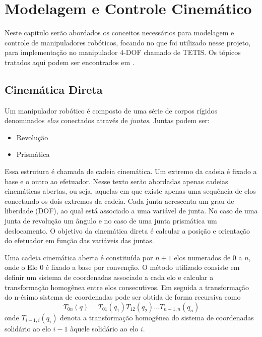 \chapter{Modelagem e Controle Cinemático}
Neste capitulo serão abordados os conceitos necessários para modelagem e controle de manipuladores robóticos, focando no que foi utilizado nesse projeto, para implementação no manipulador 4-DOF chamado de TETIS. Os tópicos tratados aqui podem ser encontrados em \citep{siciliano, petercorke}.

\section{Cinemática Direta}
Um manipulador robótico é composto de uma série de corpos rígidos denominados \textit{elos} conectados através de \textit{juntas}. 
Juntas podem ser:
\begin{itemize} 
\item Revolução
\item Prismática
\end{itemize}

Essa estrutura é chamada de cadeia cinemática.
Um extremo da cadeia é fixado a base e o outro ao efetuador.
Nesse texto serão abordadas apenas cadeias cinemáticas abertas, ou seja, aquelas em que existe apenas uma sequência de elos conectando os dois extremos da cadeia.
Cada junta acrescenta um grau de liberdade (DOF), ao qual está associado a uma variável de junta. No caso de uma junta de revolução um ângulo e no caso de uma junta prismática um deslocamento.
O objetivo da cinemática direta é calcular a posição e orientação do efetuador em função das variáveis das juntas.


Uma cadeia cinemática aberta é constituída por $n+1$ elos numerados de $0$ a $n$, onde o Elo 0 é fixado a base por convenção. O método utilizado consiste em definir um sistema de coordenadas associado a cada elo e calcular a transformação homogênea entre elos consecutivos. Em seguida a transformação do n-ésimo sistema de coordenadas pode ser obtida de forma recursiva como
\begin{equation}\label{eq:cinedireta}
{T}_{0n}({q}) = {T}_{01}(q_1) {T}_{12}(q_{2}) {\dots} {T}_{n-1,n}(q_n)
\end{equation}
onde ${T}_{i-1,i}(q_i)$ denota a transformação homogênea do sistema de coordenadas solidário ao elo $i-1$ àquele solidário ao elo $i$.


